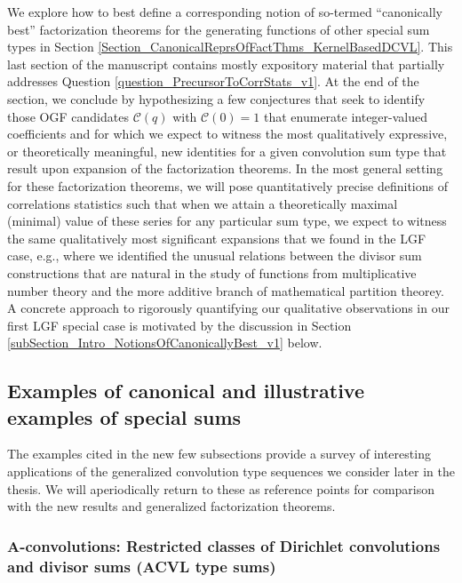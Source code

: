 \documentclass[12pt,reqno,a4letter]{article}
\numberwithin{figure}{section}
\numberwithin{table}{section}
\numberwithin{equation}{section}
\theoremstyle{plain}
\numberwithin{theorem}{section}
\theoremstyle{definition}
\begin{document}
We explore how to best define a corresponding notion of so-termed ``canonically best'' factorization theorems  
for the generating functions of other special sum types in 
Section \ref{Section_CanonicalReprsOfFactThms_KernelBasedDCVL}. 
This last section of the manuscript contains mostly expository material that 
partially addresses Question \ref{question_PrecursorToCorrStats_v1}. 
At the end of the section, we conclude by  hypothesizing a few conjectures 
that seek to identify those OGF candidates $\mathcal{C}(q)$ with 
$\mathcal{C}(0) = 1$ that enumerate integer-valued coefficients and for which we 
expect to witness the most qualitatively expressive, 
or theoretically meaningful, new identities for a given 
convolution sum type that result upon expansion of the factorization theorems. 
In the most general setting for these factorization theorems, 
we will pose quantitatively precise definitions of 
correlations statistics such that when we attain a theoretically maximal (minimal) 
value of these series for any particular sum type, we expect to witness the same 
qualitatively most significant expansions that we found in the LGF case, e.g., where we 
identified the unusual relations between the divisor sum constructions that are natural 
in the study of functions from multiplicative number theory and the more 
additive branch of mathematical partition theorey. 
A concrete approach to rigorously 
quantifying our qualitative observations in our first LGF special case is motivated by 
the discussion in Section \ref{subSection_Intro_NotionsOfCanonicallyBest_v1} below. 

\subsection{Examples of canonical and illustrative examples of special sums}

The examples cited in the new few subsections 
provide a survey of interesting applications of the generalized convolution type sequences 
we consider later in the thesis.
We will aperiodically return to these as reference points for comparison with the 
new results and generalized factorization theorems. 

\subsubsection{A-convolutions: Restricted classes of Dirichlet convolutions and divisor sums (ACVL type sums)} 
\end{document}
